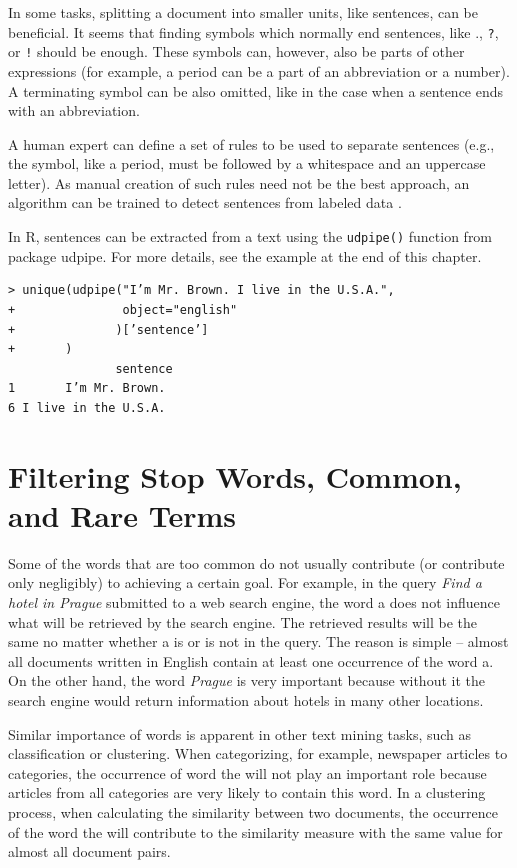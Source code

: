 In some tasks, splitting a document into smaller units, like sentences, can be
beneficial. It seems that finding symbols which normally end sentences, like .,
\texttt{?}, or \texttt{!} should be enough. These symbols can, however, also be parts of other expressions (for example, a period can be a part of an abbreviation or a number).
A terminating symbol can be also omitted, like in the case when a sentence ends
with an abbreviation.

A human expert can define a set of rules to be used to separate sentences
(e.g., the symbol, like a period, must be followed by a whitespace and an uppercase letter). As manual creation of such rules need not be the best approach, an
algorithm can be trained to detect sentences from labeled data \cite{ref225}.

In R, sentences can be extracted from a text using the \texttt{udpipe()} function
from package udpipe. For more details, see the example at the end of this chapter.

\begin{verbatim}
> unique(udpipe("I’m Mr. Brown. I live in the U.S.A.",
+               object="english"
+              )[’sentence’]
+       )
               sentence
1       I’m Mr. Brown.
6 I live in the U.S.A.
\end{verbatim}  

\section{Filtering Stop Words, Common, and Rare Terms}

Some of the words that are too common do not usually contribute (or contribute
only negligibly) to achieving a certain goal. For example, in the query \textit{Find a
hotel in Prague} submitted to a web search engine, the word a does not influence
what will be retrieved by the search engine. The retrieved results will be the same
no matter whether a is or is not in the query. The reason is simple – almost all
documents written in English contain at least one occurrence of the word a. On
the other hand, the word \textit{Prague} is very important because without it the search
engine would return information about hotels in many other locations.

Similar importance of words is apparent in other text mining tasks, such as
classification or clustering. When categorizing, for example, newspaper articles
to categories, the occurrence of word the will not play an important role because
articles from all categories are very likely to contain this word. In a clustering
process, when calculating the similarity between two documents, the occurrence
of the word the will contribute to the similarity measure with the same value for
almost all document pairs.

